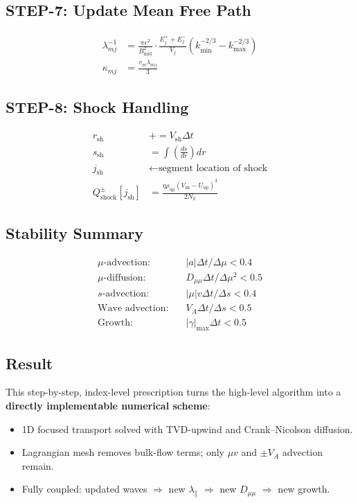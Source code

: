 {\subsection*{STEP-7: Update Mean Free Path}
\begin{align*}
\lambda_{mj}^{-1} &= \frac{\pi e^2}{B_\text{mid}^2} \cdot \frac{E^+_j + E^-_j}{V_j} (k_\text{min}^{-2/3} - k_\text{max}^{-2/3}) \\
\kappa_{mj} &= \frac{v_m \lambda_{mj}}{3}
\end{align*}

\subsection*{STEP-8: Shock Handling}
\begin{align*}
r_\text{sh} &+= V_\text{sh} \Delta t \\
s_\text{sh} &= \int \left(\frac{ds}{dr}\right) dr \\
j_\text{sh} &\leftarrow \text{segment location of shock} \\
Q_\text{shock}^{\pm}[j_\text{sh}] &= \frac{\eta \rho_\text{up} (V_\text{sh} - U_\text{up})^3}{2 N_k}
\end{align*}

\subsection*{Stability Summary}
\begin{align*}
\mu\text{-advection:}\quad & |a| \Delta t / \Delta \mu < 0.4 \\
\mu\text{-diffusion:}\quad & D_{\mu\mu} \Delta t / \Delta \mu^2 < 0.5 \\
s\text{-advection:}\quad & |\mu| v \Delta t / \Delta s < 0.4 \\
\text{Wave advection:}\quad & V_A \Delta t / \Delta s < 0.5 \\
\text{Growth:}\quad & |\gamma|_\text{max} \Delta t < 0.5
\end{align*}

\subsection*{Result}
This step-by-step, index-level prescription turns the high-level algorithm into a \textbf{directly implementable numerical scheme}:
\begin{itemize}
    \item 1D focused transport solved with TVD-upwind and Crank--Nicolson diffusion.
    \item Lagrangian mesh removes bulk-flow terms; only $\mu v$ and $\pm V_A$ advection remain.
    \item Fully coupled: updated waves $\Rightarrow$ new $\lambda_\parallel$ $\Rightarrow$ new $D_{\mu\mu}$ $\Rightarrow$ new growth.
\end{itemize}

}
